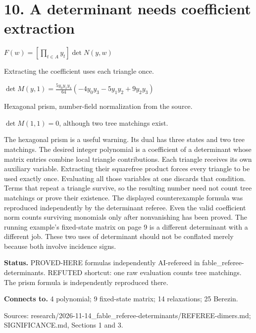 \section*{10. A determinant needs coefficient extraction}
\begin{center}\begin{minipage}{.86\textwidth}\centering
\begin{minipage}{.97\linewidth}\centering
    $\displaystyle F(w)=[\prod_{t\in A}y_t]\det N(y,w)$
    \par\bigskip Extracting the coefficient uses each triangle once.
    \par\bigskip $\displaystyle\det M(y,1)=\frac{5y_0y_1y_4}{64}
    (-4y_0y_3-5y_1y_2+9y_2y_3)$
    \par\bigskip Hexagonal prism, number-field normalization from the source.
    \par $\det M(1,1)=0$, although two tree matchings exist.
    \end{minipage}
\end{minipage}\end{center}
The hexagonal prism is a useful warning. Its dual has three states and two tree matchings. The desired integer polynomial is a coefficient of a determinant whose matrix entries combine local triangle contributions. Each triangle receives its own auxiliary variable. Extracting their squarefree product forces every triangle to be used exactly once. Evaluating all those variables at one discards that condition. Terms that repeat a triangle survive, so the resulting number need not count tree matchings or prove their existence. The displayed counterexample formula was reproduced independently by the determinant referee. Even the valid coefficient norm counts surviving monomials only after nonvanishing has been proved. The running example's fixed-state matrix on page 9 is a different determinant with a different job. These two uses of determinant should not be conflated merely because both involve incidence signs.

\textbf{Status.} PROVED-HERE formulas independently AI-refereed in fable\_referee-determinants. REFUTED shortcut: one raw evaluation counts tree matchings. The prism formula is independently reproduced there.

\textbf{Connects to.} 4 polynomial; 9 fixed-state matrix; 14 relaxations; 25 Berezin.

{\footnotesize\raggedright Sources: research/\allowbreak{}2026-11-14\_fable\_referee-determinants/\allowbreak{}REFEREE-dimers.md;\allowbreak{} SIGNIFICANCE.md, Sections 1 and 3.\par}
